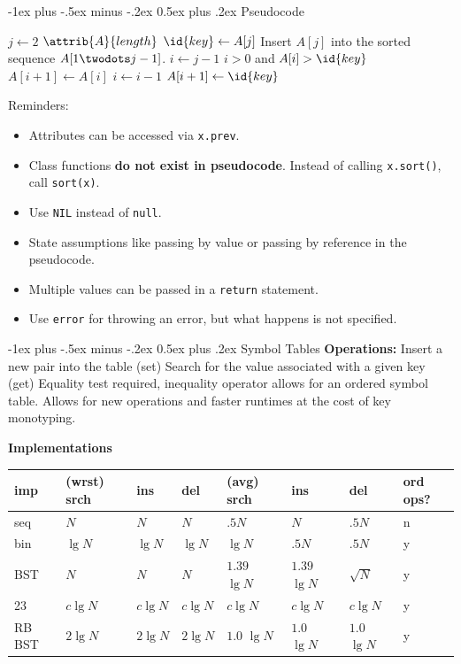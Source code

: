 \documentclass[letterpaper, 8pt]{extarticle}
\makeatletter
\renewcommand{\section}{\@startsection{section}{1}{0mm}%
                                {-1ex plus -.5ex minus -.2ex}%
                                {0.5ex plus .2ex}%
                                {\normalfont\normalsize\bfseries}}
\makeatother
\begin{document}
\begin{multicols*}{5}
  \section{Pseudocode}
  \begin{codebox}
    \li \For $j \gets 2$ \To $\attrib{A}{length}$
    \li   \Do
            $\id{key} \gets A[j]$
    \li     \Comment Insert $A[j]$ into the sorted sequence
    \li     \Comment $A[1 \twodots j-1]$.
    \li     $i \gets j-1$
    \li     \While $i > 0$ and $A[i] > \id{key}$
    \li       \Do
                $A[i+1] \gets A[i]$
    \li         $i \gets i-1$
              \End
    \li     $A[i+1] \gets \id{key}$
          \End
  \end{codebox}
  Reminders:
  \begin{itemize}
    \item Attributes can be accessed via \verb|x.prev|.
    \item Class functions \textbf{do not exist in pseudocode}.
          Instead of calling \verb|x.sort()|, call \verb|sort(x)|.
    \item Use \verb|NIL| instead of \verb|null|.
    \item State assumptions like passing by value or passing by reference
          in the pseudocode.
    \item Multiple values can be passed in a \verb|return| statement.
    \item Use \verb|error| for throwing an error, but what happens is not specified.
  \end{itemize}

  \section{Symbol Tables}
  \textbf{Operations:}
  Insert a new pair into the table (set)
  Search for the value associated with a given key (get)
  Equality test required, inequality operator allows for an ordered symbol table.
  Allows for new operations and faster runtimes at the cost of key monotyping.

  \textbf{Implementations}
  \begin{tabulary}{\linewidth}{@{}LLLLLLLL@{}} \toprule
    imp    & (wrst) srch & ins       & del       & (avg) srch     & ins            & del           & ord ops? \\ \midrule
    seq    & $N$         & $N$       & $N$       & $.5 N$         & $N$            & $.5 N$        & n        \\
    bin    & $\lg N$     & $\lg N$   & $\lg N$   & $\lg N$        & $.5 N$         & $.5 N$        & y        \\
    BST    & $N$         & $N$       & $N$       & $1.39$ $\lg N$ & $1.39$ $\lg N$ & $\sqrt N$     & y        \\
    23     & $c \lg N$   & $c \lg N$ & $c \lg N$ & $c \lg N$      & $c \lg N$      & $c \lg N$     & y        \\
    RB BST & $2 \lg N$   & $2 \lg N$ & $2 \lg N$ & $1.0$ $\lg N$  & $1.0$ $\lg N$  & $1.0$ $\lg N$ & y        \\
    \bottomrule
  \end{tabulary}


\end{multicols*}
\end{document}
